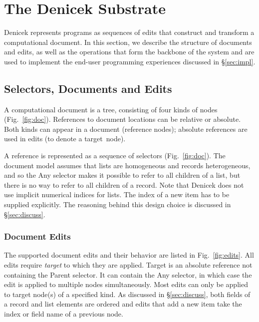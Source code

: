 \documentclass[sigconf,anonymous,screen]{acmart}
\newcommand{\ident}[1]{{\sffamily #1}}
\begin{document}

\section{The Denicek Substrate}
\label{sec:system}
Denicek represents programs as sequences of edits that construct and transform a computational
document. In this section, we describe the structure of documents and edits, as well as the
operations that form the backbone of the system and are used to implement the
end-user programming experiences discussed in \S\ref{sec:impl}.


\subsection{Selectors, Documents and Edits}
A computational document is a tree, consisting of four kinds of nodes (Fig.~\ref{fig:doc}).
References to document locations can be relative or absolute. Both kinds can appear in a
document (reference nodes); absolute references are used in edits (to denote a target~node).

A reference is represented as a sequence of selectors (Fig.~\ref{fig:doc}).
The document model assumes that lists are homogeneous and records heterogeneous, and so the
\ident{Any} selector makes it possible to refer to all children of a list, but there is no
way to refer to all children of a record. Note that Denicek does not use implicit numerical
indices for lists. The index of a new item has to be supplied explicitly. The reasoning behind
this design choice is discussed in \S\ref{sec:discuss}.

\subsubsection*{Document Edits}
The supported document edits and their behavior are listed in Fig.~\ref{fig:edits}. All edits
require \emph{target} to which they are applied. Target is an absolute reference not containing the
\ident{Parent} selector. It can contain the \ident{Any} selector, in which case the edit is applied
to multiple nodes simultaneously. Most edits can only be applied to target node(s) of a specified
kind. As discussed in \S\ref{sec:discuss}, both fields of a record and list elements are ordered
and edits that add a new item take the index or field name of a previous node.
\end{document}
